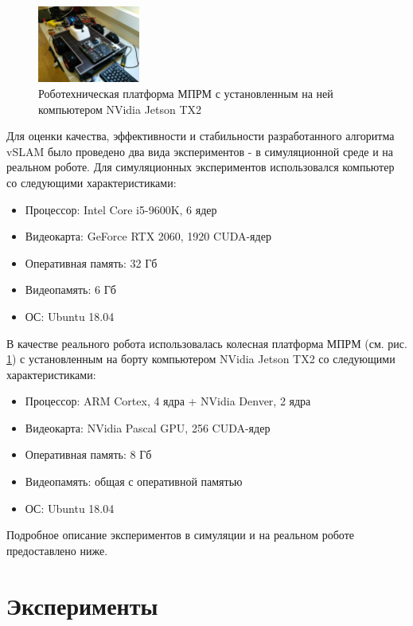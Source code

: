 \documentclass{mipt-thesis-ms}
\begin{document}
	\begin{figure}
		\centering
		\includegraphics[width=0.3\textwidth]{img/mprm.jpg}
		\caption{Роботехническая платформа МПРМ с установленным на ней компьютером NVidia Jetson TX2}
		\label{figure_mprm}
	\end{figure}
	
	Для оценки качества, эффективности и стабильности разработанного алгоритма vSLAM было проведено два вида экспериментов - в симуляционной среде и на реальном роботе. Для симуляционных экспериментов использовался компьютер со следующими характеристиками:
	
	\begin{itemize}
		\item Процессор: Intel Core i5-9600K, 6 ядер
		\item Видеокарта: GeForce RTX 2060, 1920 CUDA-ядер
		\item Оперативная память: 32 Гб
		\item Видеопамять: 6 Гб
		\item ОС: Ubuntu 18.04
 	\end{itemize}
 
 	В качестве реального робота использовалась колесная платформа МПРМ (см. рис. \ref{figure_mprm}) с установленным на борту компьютером NVidia Jetson TX2 со следующими характеристиками:
 	
 	\begin{itemize}
 		\item Процессор: ARM Cortex, 4 ядра + NVidia Denver, 2 ядра
 		\item Видеокарта: NVidia Pascal GPU, 256 CUDA-ядер
 		\item Оперативная память: 8 Гб
 		\item Видеопамять: общая с оперативной памятью
 		\item ОС: Ubuntu 18.04
 	\end{itemize}
 
 	Подробное описание экспериментов в симуляции и на реальном роботе предоставлено ниже.
	
	\section{Эксперименты}
	
\end{document}
